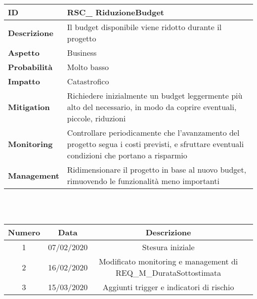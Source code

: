 \begin{tabular}{|p{2.2cm}|p{9.6cm}| }
 	\hline
	\textbf{ID} & RSC\_ RiduzioneBudget\\ [0.5ex] 
	\hline
	\textbf{Descrizione} & Il budget disponibile viene ridotto durante il progetto\\ 
	\hline
	\textbf{Aspetto} &  Business\\
	\hline
	\textbf{Probabilità} & Molto basso\\ 
	\hline
	\textbf{Impatto} & Catastrofico\\
	\hline
	\textbf{Mitigation} & Richiedere inizialmente un budget leggermente più alto del necessario, in modo da coprire eventuali, piccole, riduzioni\\
	\hline
	\textbf{Monitoring} & Controllare periodicamente che l'avanzamento del progetto segua i costi previsti, e sfruttare eventuali condizioni che portano a risparmio\\ 
	\hline
	\textbf{Management} & Ridimensionare il progetto in base al nuovo budget, rimuovendo le funzionalità meno importanti\\ 
	\hline
\end{tabular}

\renewcommand\theadfont{}

\newpage
{} \\ \\
\begin{tabular}{|c | c | c | c|} 
 	\hline
	 Numero & Data & Descrizione \\ [0.5ex] 
	\hline\hline
	1 & 07/02/2020 & Stesura iniziale \\ 
	\hline
	2 & 16/02/2020 & Modificato monitoring e management di REQ\_M\_DurataSottostimata \\
	\hline
	3 & 15/03/2020 & Aggiunti trigger e indicatori di rischio \\
	\hline
\end{tabular}